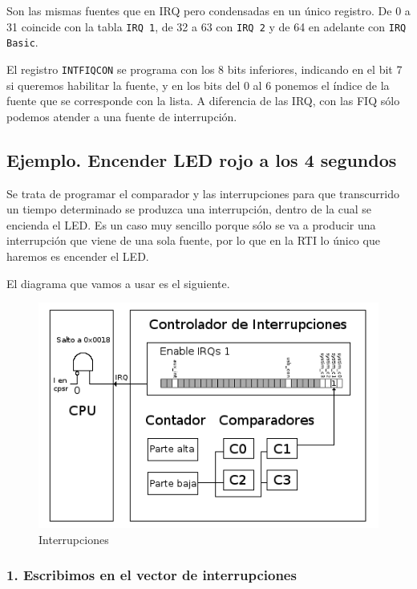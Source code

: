Son las mismas fuentes que en IRQ pero condensadas en un único registro. De 0 a 31 coincide
con la tabla {\tt IRQ 1}, de 32 a 63 con {\tt IRQ 2} y de 64 en adelante con {\tt IRQ Basic}.

El registro {\tt INTFIQCON} se programa con los 8 bits inferiores, indicando en el bit 7 si
queremos habilitar la fuente, y en los bits del 0 al 6 ponemos el índice de la fuente que
se corresponde con la lista. A diferencia de las IRQ, con las FIQ sólo podemos atender a
una fuente de interrupción. 

\subsection{Ejemplo. Encender LED rojo a los 4 segundos}

Se trata de programar el comparador y las interrupciones para que
transcurrido un tiempo determinado se produzca una interrupción, dentro
de la cual se encienda el LED. Es un caso muy sencillo porque sólo
se va a producir una interrupción que viene de una sola fuente, por
lo que en la RTI lo único que haremos es encender el LED.

El diagrama que vamos a usar es el siguiente.

\begin{figure}[h]
  \centering
    \includegraphics[width=14cm]{graphs/inter1.png}
  \caption{Interrupciones}
  \label{fig:inter1}
\end{figure}

\subsubsection{1. Escribimos en el vector de interrupciones}

